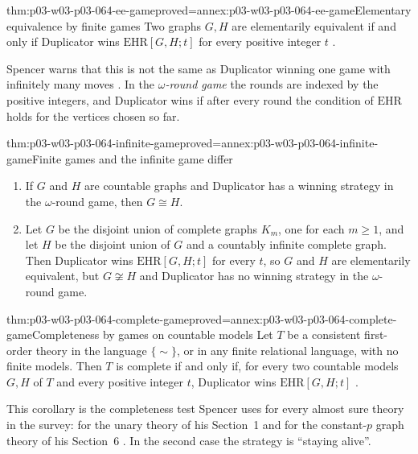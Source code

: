 \begin{hbcorollary}{thm:p03-w03-p03-064-ee-game}{proved=annex:p03-w03-p03-064-ee-game}{Elementary equivalence by finite games}
Two graphs \(G,H\) are elementarily equivalent if and only if Duplicator
wins \(\mathrm{EHR}[G,H;t]\) for every positive integer \(t\)
\cite[p.~27]{Spencer2007LogicRandomStructuresAuthor}.
\end{hbcorollary}

Spencer warns that this is not the same as Duplicator winning one game with
infinitely many moves \cite[p.~27]{Spencer2007LogicRandomStructuresAuthor}.
In the \emph{\(\omega\)-round game} the rounds are indexed by the positive
integers, and Duplicator wins if after every round the condition of
\(\mathrm{EHR}\) holds for the vertices chosen so far.

\begin{hbtheorem}{thm:p03-w03-p03-064-infinite-game}{proved=annex:p03-w03-p03-064-infinite-game}{Finite games and the infinite game differ}
\begin{enumerate}
\item If \(G\) and \(H\) are countable graphs and Duplicator has a winning
  strategy in the \(\omega\)-round game, then \(G\cong H\).
\item Let \(G\) be the disjoint union of complete graphs \(K_m\), one for
  each \(m\geq1\), and let \(H\) be the disjoint union of \(G\) and a
  countably infinite complete graph.  Then Duplicator wins
  \(\mathrm{EHR}[G,H;t]\) for every \(t\), so \(G\) and \(H\) are
  elementarily equivalent, but \(G\not\cong H\) and Duplicator has no
  winning strategy in the \(\omega\)-round game.
\end{enumerate}
\end{hbtheorem}

\begin{hbcorollary}{thm:p03-w03-p03-064-complete-game}{proved=annex:p03-w03-p03-064-complete-game}{Completeness by games on countable models}
Let \(T\) be a consistent first-order theory in the language \(\{\sim\}\),
or in any finite relational language, with no finite models.  Then \(T\) is
complete if and only if, for every two countable models \(G,H\) of \(T\) and
every positive integer \(t\), Duplicator wins \(\mathrm{EHR}[G,H;t]\)
\cite[p.~27]{Spencer2007LogicRandomStructuresAuthor}.
\end{hbcorollary}

This corollary is the completeness test Spencer uses for every almost sure
theory in the survey: for the unary theory of his Section~1
\cite[p.~3]{Spencer2007LogicRandomStructuresAuthor} and for the
constant-\(p\) graph theory of his Section~6
\cite[pp.~12--13]{Spencer2007LogicRandomStructuresAuthor}.  In the second
case the strategy is ``staying alive''.

